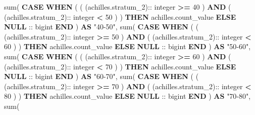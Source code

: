 \documentclass[
]{book}
\newenvironment{Shaded}{\begin{snugshade}}{\end{snugshade}}
\newcommand{\ControlFlowTok}[1]{\textcolor[rgb]{0.13,0.29,0.53}{\textbf{#1}}}
\newcommand{\DataTypeTok}[1]{\textcolor[rgb]{0.13,0.29,0.53}{#1}}
\newcommand{\DecValTok}[1]{\textcolor[rgb]{0.00,0.00,0.81}{#1}}
\newcommand{\FunctionTok}[1]{\textcolor[rgb]{0.00,0.00,0.00}{#1}}
\newcommand{\KeywordTok}[1]{\textcolor[rgb]{0.13,0.29,0.53}{\textbf{#1}}}
\newcommand{\NormalTok}[1]{#1}
\newcommand{\OperatorTok}[1]{\textcolor[rgb]{0.81,0.36,0.00}{\textbf{#1}}}
\newcommand{\OtherTok}[1]{\textcolor[rgb]{0.56,0.35,0.01}{#1}}
\begin{document}
\begin{Shaded}
\begin{Highlighting}[]
   \FunctionTok{sum}\NormalTok{(}
     \ControlFlowTok{CASE} \ControlFlowTok{WHEN}\NormalTok{ (}
\NormalTok{       (}
\NormalTok{         (achilles.stratum\_2):: }\DataTypeTok{integer} \OperatorTok{\textgreater{}=} \DecValTok{40}
\NormalTok{       ) }
       \KeywordTok{AND}\NormalTok{ (}
\NormalTok{         (achilles.stratum\_2):: }\DataTypeTok{integer} \OperatorTok{\textless{}} \DecValTok{50}
\NormalTok{       )}
\NormalTok{     ) }\ControlFlowTok{THEN}\NormalTok{ achilles.count\_value }\ControlFlowTok{ELSE} \KeywordTok{NULL}\NormalTok{ :: bigint }\ControlFlowTok{END}
\NormalTok{   ) }\KeywordTok{AS} \OtherTok{"40{-}50"}\NormalTok{, }
   \FunctionTok{sum}\NormalTok{(}
     \ControlFlowTok{CASE} \ControlFlowTok{WHEN}\NormalTok{ (}
\NormalTok{       (}
\NormalTok{         (achilles.stratum\_2):: }\DataTypeTok{integer} \OperatorTok{\textgreater{}=} \DecValTok{50}
\NormalTok{       ) }
       \KeywordTok{AND}\NormalTok{ (}
\NormalTok{         (achilles.stratum\_2):: }\DataTypeTok{integer} \OperatorTok{\textless{}} \DecValTok{60}
\NormalTok{       )}
\NormalTok{     ) }\ControlFlowTok{THEN}\NormalTok{ achilles.count\_value }\ControlFlowTok{ELSE} \KeywordTok{NULL}\NormalTok{ :: bigint }\ControlFlowTok{END}
\NormalTok{   ) }\KeywordTok{AS} \OtherTok{"50{-}60"}\NormalTok{, }
   \FunctionTok{sum}\NormalTok{(}
     \ControlFlowTok{CASE} \ControlFlowTok{WHEN}\NormalTok{ (}
\NormalTok{       (}
\NormalTok{         (achilles.stratum\_2):: }\DataTypeTok{integer} \OperatorTok{\textgreater{}=} \DecValTok{60}
\NormalTok{       ) }
       \KeywordTok{AND}\NormalTok{ (}
\NormalTok{         (achilles.stratum\_2):: }\DataTypeTok{integer} \OperatorTok{\textless{}} \DecValTok{70}
\NormalTok{       )}
\NormalTok{     ) }\ControlFlowTok{THEN}\NormalTok{ achilles.count\_value }\ControlFlowTok{ELSE} \KeywordTok{NULL}\NormalTok{ :: bigint }\ControlFlowTok{END}
\NormalTok{   ) }\KeywordTok{AS} \OtherTok{"60{-}70"}\NormalTok{, }
   \FunctionTok{sum}\NormalTok{(}
     \ControlFlowTok{CASE} \ControlFlowTok{WHEN}\NormalTok{ (}
\NormalTok{       (}
\NormalTok{         (achilles.stratum\_2):: }\DataTypeTok{integer} \OperatorTok{\textgreater{}=} \DecValTok{70}
\NormalTok{       ) }
       \KeywordTok{AND}\NormalTok{ (}
\NormalTok{         (achilles.stratum\_2):: }\DataTypeTok{integer} \OperatorTok{\textless{}} \DecValTok{80}
\NormalTok{       )}
\NormalTok{     ) }\ControlFlowTok{THEN}\NormalTok{ achilles.count\_value }\ControlFlowTok{ELSE} \KeywordTok{NULL}\NormalTok{ :: bigint }\ControlFlowTok{END}
\NormalTok{   ) }\KeywordTok{AS} \OtherTok{"70{-}80"}\NormalTok{, }
   \FunctionTok{sum}\NormalTok{(}

\end{Highlighting}
\end{Shaded}
\end{document}
